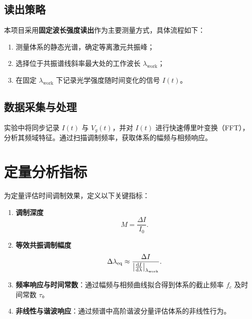 \documentclass[12pt,a4paper]{article}
\begin{document}
\subsection{读出策略}

本项目采用\textbf{固定波长强度读出}作为主要测量方式，具体流程如下：

\begin{enumerate}
  \item 测量体系的静态光谱，确定等离激元共振峰；
  \item 选择位于共振谱线斜率最大处的工作波长 $\lambda_{\mathrm{work}}$；
  \item 在固定 $\lambda_{\mathrm{work}}$ 下记录光学强度随时间变化的信号 $I(t)$。
\end{enumerate}

\subsection{数据采集与处理}

实验中将同步记录 $I(t)$ 与 $V_g(t)$，并对 $I(t)$ 进行快速傅里叶变换（FFT），分析其频域特征。通过扫描调制频率，获取体系的幅频与相频响应。

\section{定量分析指标}

为定量评估时间调制效果，定义以下关键指标：

\begin{enumerate}
  \item \textbf{调制深度}
  \begin{equation}
  M = \frac{\Delta I}{I_0}.
  \end{equation}

  \item \textbf{等效共振调制幅度}
  \begin{equation}
  \Delta \lambda_{\mathrm{eq}} \approx 
  \frac{\Delta I}{\left| \dv{I}{\lambda} \right|_{\lambda_{\mathrm{work}}}}.
  \end{equation}

  \item \textbf{频率响应与时间常数}：通过幅频与相频曲线拟合得到体系的截止频率 $f_c$ 及时间常数 $\tau$。

  \item \textbf{非线性与谐波响应}：通过频谱中高阶谐波分量评估体系的非线性行为。
\end{enumerate}
\end{document}
